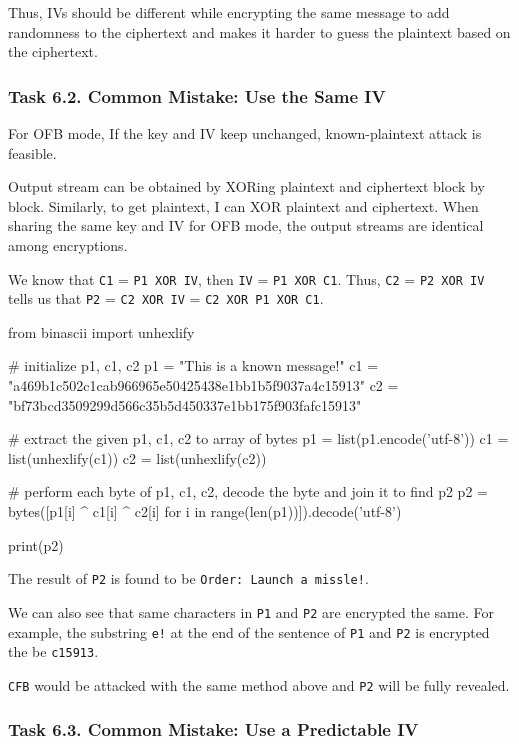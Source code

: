 \documentclass{article}
\begin{document}
Thus, IVs should be different while encrypting the same message to add randomness
to the ciphertext and makes it harder to guess the plaintext based on the ciphertext.

\subsubsection{Task 6.2. Common Mistake: Use the Same IV}

For OFB mode, If the key and IV keep unchanged, known-plaintext attack is feasible.

Output stream can be obtained by XORing plaintext and ciphertext block by block.
Similarly, to get plaintext, I can XOR plaintext and ciphertext. When sharing the
same key and IV for OFB mode, the output streams are identical among encryptions.

We know that \texttt{C1} = \texttt{P1 XOR IV}, then \texttt{IV} = \texttt{P1 XOR C1}.
Thus, \texttt{C2} = \texttt{P2 XOR IV} tells us that \texttt{P2} = \texttt{C2 XOR
IV} = \texttt{C2 XOR P1 XOR C1}.

\begin{python}
from binascii import unhexlify

# initialize p1, c1, c2
p1 = "This is a known message!"
c1 = "a469b1c502c1cab966965e50425438e1bb1b5f9037a4c15913"
c2 = "bf73bcd3509299d566c35b5d450337e1bb175f903fafc15913"

# extract the given p1, c1, c2 to array of bytes
p1 = list(p1.encode('utf-8'))
c1 = list(unhexlify(c1))
c2 = list(unhexlify(c2))

# perform each byte of p1, c1, c2, decode the byte and join it to find p2
p2 = bytes([p1[i] ^ c1[i] ^ c2[i] for i in range(len(p1))]).decode('utf-8')

print(p2)
\end{python}

The result of \texttt{P2} is found to be \texttt{Order: Launch a missle!}.

We can also see that same characters in \texttt{P1} and \texttt{P2} are encrypted
the same. For example, the substring \texttt{e!} at the end of the sentence of \texttt{P1}
and \texttt{P2} is encrypted the be \texttt{c15913}.

\texttt{CFB} would be attacked with the same method above and \texttt{P2} will
be fully revealed.

\subsubsection{Task 6.3. Common Mistake: Use a Predictable IV}
\end{document}
